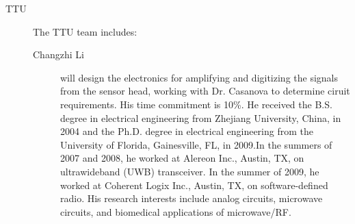\begin{description}
\begin{description}
  \end{description} 
\item[TTU] The TTU team includes:
  \begin{description}
  \item[Changzhi Li] will design the electronics for amplifying and digitizing the signals from the sensor head, working with Dr. Casanova to determine ciruit requirements. His time commitment is 10\%. He received the B.S. degree in electrical engineering from Zhejiang University, China, in 2004 and the Ph.D. degree in electrical engineering from the University of Florida, Gainesville, FL, in 2009.In the summers of 2007 and 2008, he worked at Alereon Inc., Austin, TX, on ultrawideband (UWB) transceiver. In the summer of 2009, he worked at Coherent Logix Inc., Austin, TX, on software-defined radio. His research interests include analog circuits, microwave circuits, and biomedical applications of microwave/RF.
  \end{description}
\end{description}


